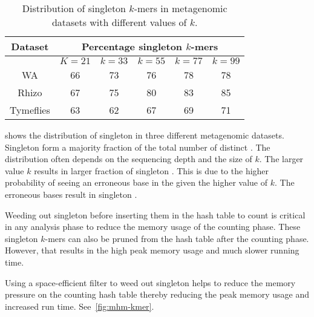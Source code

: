 \begin{wraptable}{r}{4.5in}
\centering
    \begin{tabular}{c | c | c | c | c | c}
    \toprule
    {\bf Dataset} & \multicolumn{5}{c}{\bf Percentage singleton $k$-mers} \\
    \midrule
    & $K=21$ & $k=33$ & $k=55$ & $k=77$ & $k=99$ \\
    \midrule
    WA &  66 & 73 & 76 & 78 & 78  \\
    Rhizo &  67 & 75 & 80 & 83 & 85  \\
    Tymeflies & 63 & 62 & 67 & 69 & 71 \\
    \bottomrule
    \end{tabular}
    \caption{Distribution of singleton $k$-mers in metagenomic datasets with different values of $k$.}
    \label{tab:kmer-dist}
\end{wraptable}

 shows the distribution of singleton \kmers in three
different metagenomic datasets. Singleton \kmers form a majority fraction of
the total number of distinct \kmers. The distribution often depends on the
sequencing depth and the size of $k$. The larger value $k$ results in larger
fraction of singleton \kmers. This is due to the higher probability of seeing
an erroneous base in the \kmer given the higher value of $k$. The erroneous
bases result in singleton \kmers.

Weeding out singleton \kmers before inserting them in the hash table to count
is critical in any \kmer analysis phase to reduce the memory usage of the
counting phase. These singleton $k$-mers can also be pruned from the hash table
after the counting phase. However, that results in the high peak memory usage
and much slower running time.

Using a space-efficient filter to weed out singleton \kmers helps to reduce
the memory pressure on the counting hash table thereby reducing the peak memory
usage and increased run time. See~\cref{fig:mhm-kmer}.


